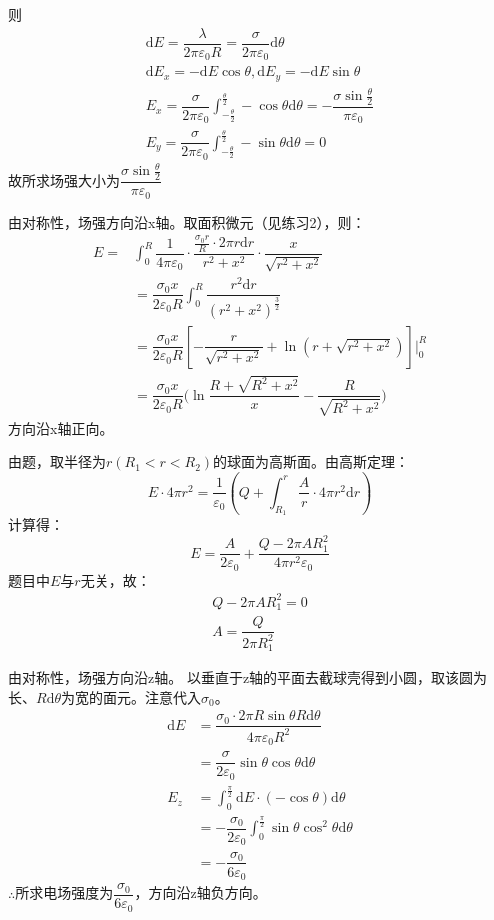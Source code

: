 \documentclass[b5paper,opensource,sourcefont,parskip]{qyxf-book}
\newcommand{\di}[1]{\mathrm{d}#1}
\begin{document}
则
\begin{gather*}
	\di{E}=\dfrac{\lambda}{2\pi\varepsilon_0R}=\dfrac{\sigma}{2\pi\varepsilon_0}\di{\theta}\\
	\di{E_x}=-\di{E}\cos\theta,\di{E_y}=-\di{E}\sin\theta\\
	E_x=\dfrac{\sigma}{2\pi\varepsilon_0}\int_{-\frac{\theta}{2}}^{\frac{\theta}{2}}-\cos\theta\di{\theta}=-\dfrac{\sigma\sin\frac{\theta}{2}}{\pi\varepsilon_0}\\
	E_y=\dfrac{\sigma}{2\pi\varepsilon_0}\int_{-\frac{\theta}{2}}^{\frac{\theta}{2}}-\sin\theta\di{\theta}=0
\end{gather*}
故所求场强大小为$\dfrac{\sigma\sin\frac{\theta}{2}}{\pi\varepsilon_0}$


\solve
由对称性，场强方向沿x轴。取面积微元（见练习2），则：
\begin{align*}
	E=&\int_0^R\dfrac{1}{4\pi\varepsilon_0}\cdot\dfrac{\frac{\sigma_0r}{R}\cdot 2\pi r\di{r}}{r^2+x^2}\cdot\dfrac{x}{\sqrt{r^2+x^2}}\\
	&=\dfrac{\sigma_0x}{2\varepsilon_0R}\int_0^R\dfrac{r^2\di{r}}{{(r^2+x^2)}^\frac{3}{2}}\\
	&=\dfrac{\sigma_0x}{2\varepsilon_0R}[-\dfrac{r}{\sqrt{r^2+x^2}}+\ln(r+\sqrt{r^2+x^2})]\Big|_0^R\\
	&=\dfrac{\sigma_0x}{2\varepsilon_0R}\big(\ln\dfrac{R+\sqrt{R^2+x^2}}{x}-\dfrac{R}{\sqrt{R^2+x^2}}\big)
\end{align*}
方向沿x轴正向。


\solve
由题，取半径为$r(R_1<r<R_2)$的球面为高斯面。由高斯定理：
\begin{equation*}
	E\cdot 4\pi r^2=\dfrac{1}{\varepsilon_0}(Q+\int_{R_1}^r\dfrac{A}{r}\cdot 4\pi r^2\di{r})
\end{equation*}
计算得：
\begin{equation*}
	E=\dfrac{A}{2\varepsilon_0}+\dfrac{Q-2\pi AR_1^2}{4\pi r^2\varepsilon_0}
\end{equation*}
题目中$E$与$r$无关，故：
\begin{gather*}
	Q-2\pi AR_1^2=0\\
	A=\dfrac{Q}{2\pi R_1^2}
\end{gather*}



\solve
由对称性，场强方向沿z轴。
以垂直于z轴的平面去截球壳得到小圆，取该圆为长、$R\di{\theta}$为宽的面元。注意代入$\sigma_0$。
\begin{align*}
	\di{E}&=\dfrac{\sigma_0\cdot 2\pi R\sin \theta R\di{\theta}}{4\pi \varepsilon_0 R^2}\\
	&=\dfrac{\sigma}{2\varepsilon_0}\sin\theta\cos\theta\di{\theta}\\
	E_z&=\int_0^{\frac{\pi}{2}}\di{E}\cdot(-\cos\theta)\di{\theta}\\
	&=-\dfrac{\sigma_0}{2\varepsilon_0}\int_0^{\frac{\pi}{2}}\sin\theta\cos^2\theta\di{\theta}\\
	&=-\dfrac{\sigma_0}{6\varepsilon_0}
\end{align*}
$\therefore$所求电场强度为$\dfrac{\sigma_0}{6\varepsilon_0}$，方向沿z轴负方向。
\end{document}
